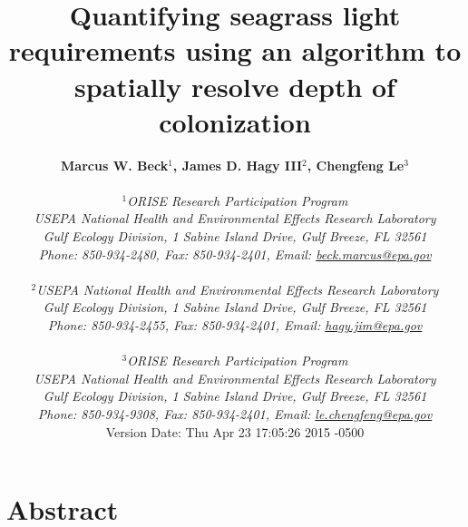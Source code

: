 \documentclass[letterpaper,12pt,oneside]{article}\usepackage[]{graphicx}\usepackage[]{color}
\begin{document}
\raggedbottom
\linenumbers
\raggedright
{}
\setlength{\parindent}{0.5in}
\renewcommand\refname{References \vspace{12pt}}

\begin{singlespace}
\title{{\bf {\Large Quantifying seagrass light requirements using an algorithm to spatially resolve depth of colonization}}}
\author{
  {\bf {\normalsize Marcus W. Beck$^1$, James D. Hagy III$^2$, Chengfeng Le$^3$}}
  \\\\{\textit {\normalsize $^1$ORISE Research Participation Program}}
  \\{\textit {\normalsize USEPA National Health and Environmental Effects Research Laboratory}}
  \\{\textit {\normalsize Gulf Ecology Division, 1 Sabine Island Drive, Gulf Breeze, FL 32561}}
	\\{\textit {\normalsize Phone: 850-934-2480, Fax: 850-934-2401, Email: \href{mailto:beck.marcus@epa.gov}{beck.marcus@epa.gov}}}
  \\\\{\textit {\normalsize $^2$USEPA National Health and Environmental Effects Research Laboratory}}
	\\{\textit {\normalsize Gulf Ecology Division, 1 Sabine Island Drive, Gulf Breeze, FL 32561}}
	\\{\textit {\normalsize Phone: 850-934-2455, Fax: 850-934-2401, Email: \href{mailto:hagy.jim@epa.gov}{hagy.jim@epa.gov}}}
  \\\\{\textit {\normalsize $^3$ORISE Research Participation Program}}
  \\{\textit {\normalsize USEPA National Health and Environmental Effects Research Laboratory}}
  \\{\textit {\normalsize Gulf Ecology Division, 1 Sabine Island Drive, Gulf Breeze, FL 32561}}
  \\{\textit {\normalsize Phone: 850-934-9308, Fax: 850-934-2401, Email: \href{mailto:le.chengfeng@epa.gov}{le.chengfeng@epa.gov}}}
  \vspace{1in} 
  \\ Version Date:   Thu Apr 23 17:05:26 2015 -0500
	}
\date{}
\maketitle
\end{singlespace}
\clearpage

\section*{Abstract}
\end{document}

